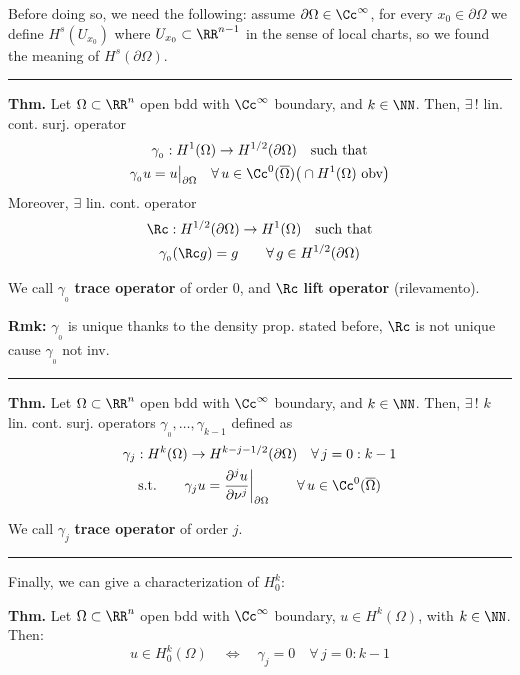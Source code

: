 Before doing so, we need the following: assume $\partial\Omega\in\Cc^\infty$, for every $x_0\in\partial\Omega$ we define $H^s(U_{x_0})$ where $U_{x_0}\subset\RR^{n-1}$ in the sense of local charts, so we found the meaning of $H^s(\partial\Omega)$.

\rule{0.31\textwidth}{0.2pt}
\smallskip

\textbf{Thm.} Let $\Omega\subset\RR^n$ open bdd with $\Cc^\infty$ boundary, and $k\in\NN$. Then, $\exists\,!$ lin. cont. surj. operator 
\begin{gather*}
\gamma_{_0}:H^1(\Omega)\to H^{1/2}(\partial\Omega)\quad\text{such that} \\
\gamma_{_0} u=u\big|_{\partial\Omega}\quad\forall\, u\in\Cc^0(\overline{\Omega})\big(\cap H^1(\Omega)\text{ obv}\big)
\end{gather*}
Moreover, $\exists$ lin. cont. operator 
\begin{gather*}
\Rc:H^{1/2}(\partial\Omega)\to H^1(\Omega)\quad\text{such that} \\
\gamma_{_0}(\Rc g)=g\qquad\forall\, g\in H^{1/2}(\partial\Omega)
\end{gather*}

We call $\gamma_{_0}$ \textbf{trace operator} of order 0, and $\Rc$ \textbf{lift operator} (rilevamento).

\smallskip

\textbf{Rmk:} $\gamma_{_0}$ is unique thanks to the density prop. stated before, $\Rc$ is not unique cause $\gamma_{_0}$ not inv.

\rule{0.31\textwidth}{0.2pt}
\smallskip

\textbf{Thm.} Let $\Omega\subset\RR^n$ open bdd with $\Cc^\infty$ boundary, and $k\in\NN$. Then, $\exists\,!$ $k$ lin. cont. surj. operators $\gamma_{_0},\dots,\gamma_{k-1}$ defined as
\begin{gather*}
\gamma_j:H^k(\Omega)\to H^{k-j-1/2}(\partial\Omega)\quad\forall\,j=0:k-1\\
\text{s.t.}\qquad
\gamma_j u=\frac{\partial^j u}{\partial\nu^j} \bigg|_{\partial\Omega}\qquad\forall\, u\in \Cc^0(\overline{\Omega})
\end{gather*}

We call $\gamma_j$ \textbf{trace operator} of order $j$.

\rule{0.31\textwidth}{0.2pt}
\smallskip

Finally, we can give a characterization of $H^k_0$:

\smallskip

\textbf{Thm.} Let $\Omega\subset\RR^n$ open bdd with $\Cc^\infty$ boundary, $u\in H^k(\Omega)$, with $k\in\NN$. Then:
\begin{equation*}
u\in H^k_0(\Omega) \quad\Longleftrightarrow\quad \gamma_j=0\quad\forall\,j=0:k-1
\end{equation*}

